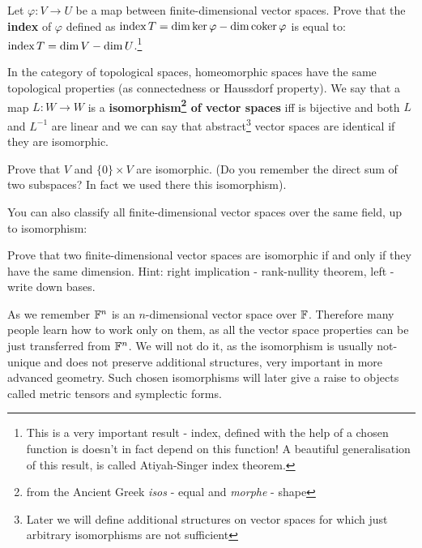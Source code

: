 \begin{prob}
  Let $\varphi : V\to U$ be a map between finite-dimensional vector spaces. Prove that the \textbf{index} of $\varphi$ defined as $\text{index\,} T=\dim \text{ker\,} \varphi - \dim \text{coker\,} \varphi$ is equal to:
   $\text{index\,} T=\dim V - \dim U$.\footnote{This is a very important result - index, defined with the help of a chosen function is doesn't in fact depend on this function! A beautiful generalisation of this result, is called Atiyah-Singer index theorem.}
\end{prob}

In the category of topological spaces, homeomorphic spaces have the same topological properties (as connectedness or Haussdorf property). We say that a map $L:W\to W$ is a
\textbf{isomorphism\footnote{from the Ancient Greek \textit{isos} - equal and \textit{morphe} - shape} of vector spaces} iff is bijective and both $L$ and $L^{-1}$ are linear and
we can say that abstract\footnote{Later we will define additional structures on vector spaces for which just arbitrary isomorphisms are not sufficient} vector spaces are identical if they are isomorphic.

\begin{prob}
  Prove that $V$ and $\{0\}\times V$ are isomorphic. (Do you remember the direct sum of two subspaces? In fact we used there this isomorphism).
\end{prob}

You can also classify all finite-dimensional vector spaces over the same field, up to isomorphism:

\begin{prob}
  Prove that two finite-dimensional vector spaces are isomorphic if and only if they have the same dimension. Hint: right implication - rank-nullity theorem, left - write down bases.
\end{prob}

As we remember $\mathbb F^n$ is an $n$-dimensional vector space over $\mathbb F$. Therefore many people learn how to work only on them, as all the vector space properties can be
just transferred from $\mathbb F^n$. We will not do it, as the isomorphism is usually not-unique and does not preserve additional structures, very important in more advanced geometry.
Such chosen isomorphisms will later give a raise to objects called metric tensors and symplectic forms.


